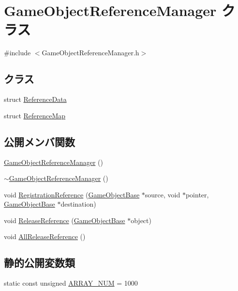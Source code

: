 \hypertarget{class_game_object_reference_manager}{}\section{Game\+Object\+Reference\+Manager クラス}
\label{class_game_object_reference_manager}


{\ttfamily \#include $<$Game\+Object\+Reference\+Manager.\+h$>$}

\subsection*{クラス}
\begin{DoxyCompactItemize}
\item 
struct \mbox{\hyperlink{struct_game_object_reference_manager_1_1_reference_data}{Reference\+Data}}
\item 
struct \mbox{\hyperlink{struct_game_object_reference_manager_1_1_reference_map}{Reference\+Map}}
\end{DoxyCompactItemize}
\subsection*{公開メンバ関数}
\begin{DoxyCompactItemize}
\item 
\mbox{\hyperlink{class_game_object_reference_manager_aed165af9f1a16894c65f974945020cda}{Game\+Object\+Reference\+Manager}} ()
\item 
\mbox{\hyperlink{class_game_object_reference_manager_a9ed62220afb840cdc3e8cbe4bbc3a19e}{$\sim$\+Game\+Object\+Reference\+Manager}} ()
\item 
void \mbox{\hyperlink{class_game_object_reference_manager_a4195eafdda534044454b6d48efc7d03d}{Registration\+Reference}} (\mbox{\hyperlink{class_game_object_base}{Game\+Object\+Base}} $\ast$source, void $\ast$pointer, \mbox{\hyperlink{class_game_object_base}{Game\+Object\+Base}} $\ast$destination)
\item 
void \mbox{\hyperlink{class_game_object_reference_manager_ac7d117427de3052f893228408a3de5d7}{Release\+Reference}} (\mbox{\hyperlink{class_game_object_base}{Game\+Object\+Base}} $\ast$object)
\item 
void \mbox{\hyperlink{class_game_object_reference_manager_ac4852ddd6d8bd5e1f13284ba6204e221}{All\+Release\+Reference}} ()
\end{DoxyCompactItemize}
\subsection*{静的公開変数類}
\begin{DoxyCompactItemize}
\item 
static const unsigned \mbox{\hyperlink{class_game_object_reference_manager_a962d30b10c5b76353645773b2c1740ce}{A\+R\+R\+A\+Y\+\_\+\+N\+UM}} = 1000
\end{DoxyCompactItemize}
